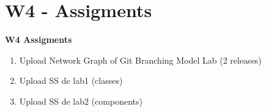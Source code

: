 \documentclass{beamer}
\begin{document}
\section{W4 - Assigments }

\begin{frame}


\textbf{W4 Assigments}


\begin{enumerate}
\item
	 
	Upload Network Graph of Git Branching Model Lab (2 releases)
\item
	Upload SS de lab1 (classes)
\item
	Upload SS de lab2 (components)

\end{enumerate} 


\end{frame}
\end{document}
